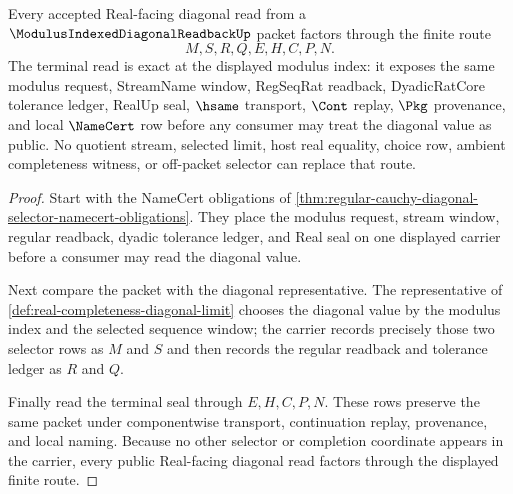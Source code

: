 \begin{theorem}
\label{thm:regular-cauchy-diagonal-selector-terminal-exactness}
Every accepted Real-facing diagonal read from a $\ModulusIndexedDiagonalReadbackUp$ packet factors through the finite route
$$
M,S,R,Q,E,H,C,P,N.
$$
The terminal read is exact at the displayed modulus index: it exposes the same modulus request, StreamName window, RegSeqRat readback, DyadicRatCore tolerance ledger, RealUp seal, $\hsame$ transport, $\Cont$ replay, $\Pkg$ provenance, and local $\NameCert$ row before any consumer may treat the diagonal value as public. No quotient stream, selected limit, host real equality, choice row, ambient completeness witness, or off-packet selector can replace that route.
\end{theorem}
\begin{proof}
Start with the NameCert obligations of \autoref{thm:regular-cauchy-diagonal-selector-namecert-obligations}. They place the modulus request, stream window, regular readback, dyadic tolerance ledger, and Real seal on one displayed carrier before a consumer may read the diagonal value.

Next compare the packet with the diagonal representative. The representative of \autoref{def:real-completeness-diagonal-limit} chooses the diagonal value by the modulus index and the selected sequence window; the carrier records precisely those two selector rows as $M$ and $S$ and then records the regular readback and tolerance ledger as $R$ and $Q$.

Finally read the terminal seal through $E,H,C,P,N$. These rows preserve the same packet under componentwise transport, continuation replay, provenance, and local naming. Because no other selector or completion coordinate appears in the carrier, every public Real-facing diagonal read factors through the displayed finite route.
\end{proof}



